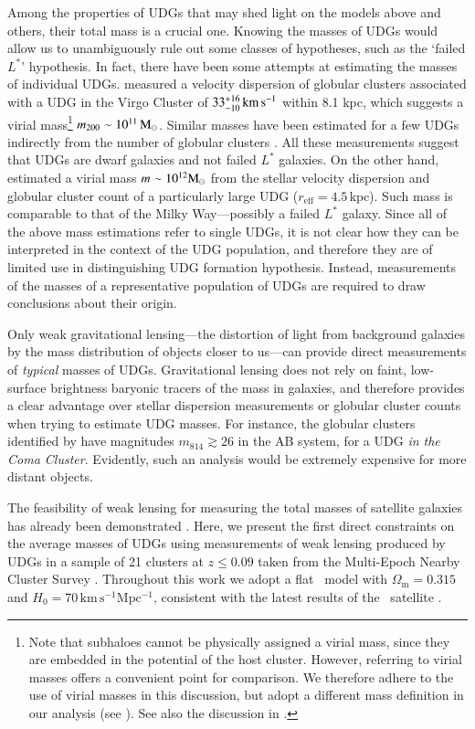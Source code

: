 \documentclass[usenatbib,fleqn]{mnras}
\def\reff{r_\mathrm{eff}}
\begin{document}
Among the properties of UDGs that may shed light on the models above and others, their total mass is a crucial one. Knowing the masses of UDGs would allow us to unambiguously rule out some classes of hypotheses, such as the `failed $L^*$' hypothesis. In fact, there have been some attempts at estimating the masses of individual UDGs. \cite{beasley16_virgo} measured a velocity dispersion of globular clusters associated with a UDG in the Virgo Cluster of $33_{-10}^{+16}\,\mathrm{km\,s^{-1}}$ within 8.1 kpc, which suggests a virial mass\footnote{Note that subhaloes cannot be physically assigned a virial mass, since they are embedded in the potential of the host cluster. However, referring to virial masses offers a convenient point for comparison. We therefore adhere to the use of virial masses in this discussion, but adopt a different mass definition in our analysis (see ). See also the discussion in \citet{sifon17}.} $m_{200}\sim10^{11}\,\mathrm{M}_\odot$. Similar masses have been estimated for a few UDGs indirectly from the number of globular clusters \citep{beasley16_acs,peng16}. All these measurements suggest that UDGs are dwarf galaxies and not failed $L^*$ galaxies. On the other hand, \cite{vandokkum16} estimated a virial mass $m\sim10^{12}\mathrm{M}_\odot$ from the stellar velocity dispersion and globular cluster count of a particularly large UDG ($\reff=4.5\,\mathrm{kpc}$). Such mass is comparable to that of the Milky Way---possibly a failed $L^*$ galaxy. Since all of the above mass estimations refer to single UDGs, it is not clear how they can be interpreted in the context of the UDG population, and therefore they are of limited use in distinguishing UDG formation hypothesis. Instead, measurements of the masses of a representative population of UDGs are required to draw conclusions about their origin.

Only weak gravitational lensing---the distortion of light from background galaxies by the mass distribution of objects closer to us---can provide direct measurements of \emph{typical} masses of UDGs. Gravitational lensing does not rely on faint, low-surface brightness baryonic tracers of the mass in galaxies, and therefore provides a clear advantage over stellar dispersion measurements or globular cluster counts when trying to estimate UDG masses. For instance, the globular clusters identified by \cite{beasley16_acs} have magnitudes $m_{814}\gtrsim26$ in the AB system, for a UDG \emph{in the Coma Cluster}. Evidently, such an analysis would be extremely expensive for more distant objects.

The feasibility of weak lensing for measuring the total masses of satellite galaxies has already been demonstrated \citep[e.g.,][]{sifon15_kids,sifon17,li16}.  
%
Here, we present the first direct constraints on the average masses of UDGs using measurements of weak lensing produced by UDGs in a sample of 21 clusters at $z\leq0.09$ taken from the Multi-Epoch Nearby Cluster Survey \citep[\meneacs,][]{sand12}. Throughout this work we adopt a flat \lcdm\ model with $\Omega_\mathrm{m}=0.315$ and $H_0=70\,\mathrm{km\,s^{-1}Mpc^{-1}}$, consistent with the latest results of the \planck\ satellite \citep{planck15xiii}.
\end{document}
